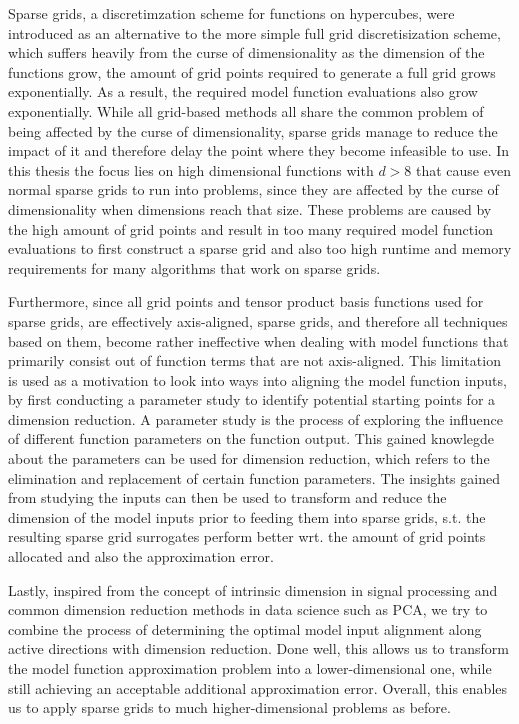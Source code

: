 \documentclass[
  a4paper,  %
  twoside,  %
  bibliography=totoc,
  headsepline,
  cleardoublepage=empty,
  parskip=half,
  draft=false
]{scrbook}
\begin{document}
Sparse grids, a discretimzation scheme for functions on hypercubes, were introduced as an alternative to the more simple full grid discretisization scheme, which suffers heavily from the curse of dimensionality as the dimension of the functions grow, the amount of grid points required to generate a full grid grows exponentially.
As a result, the required model function evaluations also grow exponentially.
While all grid-based methods all share the common problem of being affected by the curse of dimensionality, sparse grids manage to reduce the impact of it and therefore delay the point where they become infeasible to use.
In this thesis the focus lies on high dimensional functions with $d > 8$ that cause even normal sparse grids to run into problems, since they are affected by the curse of dimensionality when dimensions reach that size.
These problems are caused by the high amount of grid points and result in too many required model function evaluations to first construct a sparse grid and also too high runtime and memory requirements for many algorithms that work on sparse grids.

Furthermore, since all grid points and tensor product basis functions used for sparse grids, are effectively axis-aligned, sparse grids, and therefore all techniques based on them, become rather ineffective when dealing with model functions that primarily consist out of function terms that are not axis-aligned.
This limitation is used as a motivation to look into ways into aligning the model function inputs, by first conducting a parameter study to identify potential starting points for a dimension reduction.
A parameter study is the process of exploring the influence of different function parameters on the function output.
This gained knowlegde about the parameters can be used for dimension reduction, which refers to the elimination and replacement of certain function parameters.
The insights gained from studying the inputs can then be used to transform and reduce the dimension of the model inputs prior to feeding them into sparse grids, s.t. the resulting sparse grid surrogates perform better wrt. the amount of grid points allocated and also the approximation error. 

Lastly, inspired from the concept of intrinsic dimension in signal processing and common dimension reduction methods in data science such as PCA, we try to combine the process of determining the optimal model input alignment along active directions with dimension reduction.
Done well, this allows us to transform the model function approximation problem into a lower-dimensional one, while still achieving an acceptable additional approximation error.
Overall, this enables us to apply sparse grids to much higher-dimensional problems as before.
\end{document}
